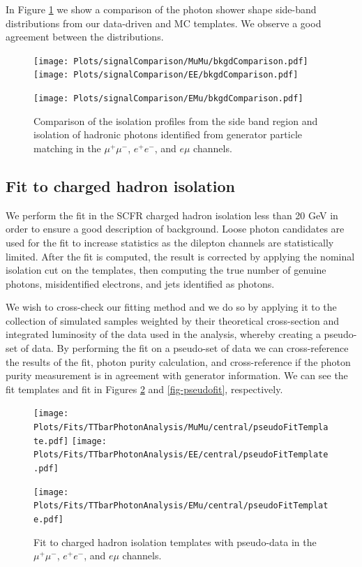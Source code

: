 In Figure \ref{fig-backgroundComparison} we show a comparison of the photon shower shape side-band distributions from our data-driven and MC templates. We observe a good agreement between the distributions.  


\begin{figure}
\texttt{[image: Plots/signalComparison/MuMu/bkgdComparison.pdf]}
\texttt{[image: Plots/signalComparison/EE/bkgdComparison.pdf]}
\begin{center}
\texttt{[image: Plots/signalComparison/EMu/bkgdComparison.pdf]}
\end{center}
\caption{Comparison of the isolation profiles from the side band region and isolation of hadronic photons identified from generator particle matching in the $\mu^{+}\mu^{-}$, $e^{+}e^{-}$, and $e\mu$ channels.}
\label{fig-backgroundComparison}
\end{figure}

\subsection{Fit to charged hadron isolation}

We perform the fit in the SCFR charged hadron isolation less than 20 GeV in order to ensure a good description of background. Loose photon candidates are used for the fit to increase statistics as the dilepton channels are statistically limited. After the fit is computed, the result is corrected by applying the nominal isolation cut on the templates, then computing the true number of genuine photons, misidentified electrons, and jets identified as photons. 

We wish to cross-check our fitting method and we do so by applying it to the collection of simulated samples weighted by their theoretical cross-section and integrated luminosity of the data used in the analysis, whereby creating a pseudo-set of data. By performing the fit on a pseudo-set of data we can cross-reference the results of the fit, photon purity calculation, and cross-reference if the photon purity measurement is in agreement with generator information. We can see the fit templates and fit in Figures \ref{fig-pseudofitTemplates} and \ref{fig-pseudofit}, respectively.


\begin{figure}
\texttt{[image: Plots/Fits/TTbarPhotonAnalysis/MuMu/central/pseudoFitTemplate.pdf]}
\texttt{[image: Plots/Fits/TTbarPhotonAnalysis/EE/central/pseudoFitTemplate.pdf]}\\
\begin{center}
\texttt{[image: Plots/Fits/TTbarPhotonAnalysis/EMu/central/pseudoFitTemplate.pdf]}
\end{center}
\caption{Fit to charged hadron isolation templates with pseudo-data in the $\mu^{+}\mu^{-}$, $e^{+}e^{-}$, and $e\mu$ channels.}
\label{fig-pseudofitTemplates}
\end{figure}

